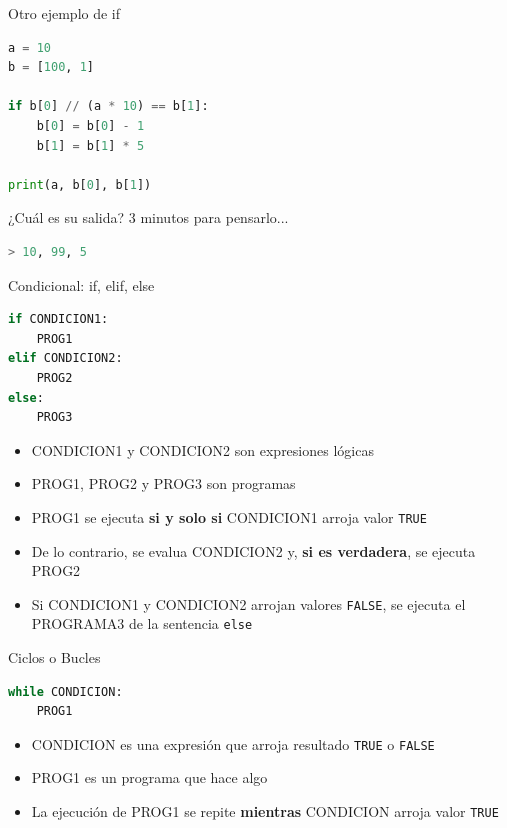 \documentclass{beamer}
\begin{document}
\begin{frame}[fragile]{Otro ejemplo de if}
\begin{lstlisting}[language=Python]
a = 10
b = [100, 1]

if b[0] // (a * 10) == b[1]:
    b[0] = b[0] - 1
    b[1] = b[1] * 5

print(a, b[0], b[1])
\end{lstlisting} \pause

¿Cuál es su salida? 3 minutos para pensarlo... \pause 
\begin{lstlisting}[language=Python]
> 10, 99, 5
\end{lstlisting}
\end{frame}

\begin{frame}[fragile]{Condicional: if, elif, else}

\begin{lstlisting}[language=Python]
if CONDICION1:
    PROG1
elif CONDICION2:
    PROG2
else:
    PROG3
\end{lstlisting} \pause

\begin{itemize}
    \item CONDICION1 y CONDICION2 son expresiones lógicas
    \item PROG1, PROG2 y PROG3  son programas 
    \item PROG1 se ejecuta \textbf{si y solo si} CONDICION1 arroja valor \texttt{TRUE}\pause
    \item De lo contrario, se evalua CONDICION2 y, \textbf{si es verdadera}, se ejecuta PROG2 \pause
    \item Si CONDICION1 y CONDICION2 arrojan valores \texttt{FALSE}, se ejecuta el PROGRAMA3 de la sentencia \texttt{else}
\end{itemize}
\end{frame}

\begin{frame}[fragile]{Ciclos o Bucles}
\begin{lstlisting}[language=Python]
while CONDICION:
    PROG1
\end{lstlisting} \pause
\begin{itemize}
    \item CONDICION es una expresión que arroja resultado \texttt{TRUE} o \texttt{FALSE}
    \item PROG1 es un programa que hace algo
    \item La ejecución de PROG1 se repite \textbf{mientras} CONDICION arroja valor \texttt{TRUE}
\end{itemize}
\end{frame}
\end{document}
